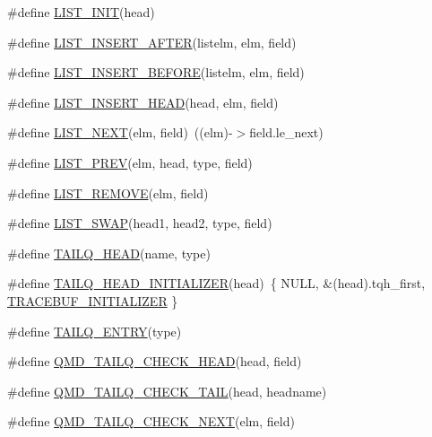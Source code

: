 \begin{DoxyCompactItemize}
\item 
\#define \hyperlink{queue_8h_a304b5b7f7bdcba2793eaba9c890991c3}{L\-I\-S\-T\-\_\-\-I\-N\-I\-T}(head)
\item 
\#define \hyperlink{queue_8h_aab62f53d4c94ab67bf7c4dc5c7670f64}{L\-I\-S\-T\-\_\-\-I\-N\-S\-E\-R\-T\-\_\-\-A\-F\-T\-E\-R}(listelm, elm, field)
\item 
\#define \hyperlink{queue_8h_a73d12127b84f84215eb03a4fb20feebb}{L\-I\-S\-T\-\_\-\-I\-N\-S\-E\-R\-T\-\_\-\-B\-E\-F\-O\-R\-E}(listelm, elm, field)
\item 
\#define \hyperlink{queue_8h_ad80d8d658fdb46a9f7cc81cb2ae54885}{L\-I\-S\-T\-\_\-\-I\-N\-S\-E\-R\-T\-\_\-\-H\-E\-A\-D}(head, elm, field)
\item 
\#define \hyperlink{queue_8h_ad150fcc4dc3e0a56600101f1f1065ed5}{L\-I\-S\-T\-\_\-\-N\-E\-X\-T}(elm, field)~((elm)-\/$>$field.\-le\-\_\-next)
\item 
\#define \hyperlink{queue_8h_a7458f2852ae931b2ed5426311b53d029}{L\-I\-S\-T\-\_\-\-P\-R\-E\-V}(elm, head, type, field)
\item 
\#define \hyperlink{queue_8h_a4f60a3fedbebc5ef6edded99062dd98d}{L\-I\-S\-T\-\_\-\-R\-E\-M\-O\-V\-E}(elm, field)
\item 
\#define \hyperlink{queue_8h_a71800bd6ea3903a1068f87e4f07cc851}{L\-I\-S\-T\-\_\-\-S\-W\-A\-P}(head1, head2, type, field)
\item 
\#define \hyperlink{queue_8h_a4abce769a262e090c1f601605b9d6c76}{T\-A\-I\-L\-Q\-\_\-\-H\-E\-A\-D}(name, type)
\item 
\#define \hyperlink{queue_8h_ac269df7d4126ed9885156cbad2cbf8af}{T\-A\-I\-L\-Q\-\_\-\-H\-E\-A\-D\-\_\-\-I\-N\-I\-T\-I\-A\-L\-I\-Z\-E\-R}(head)~\{ N\-U\-L\-L, \&(head).tqh\-\_\-first, \hyperlink{queue_8h_a0397af84b4a238c2b678721a88b6eccc}{T\-R\-A\-C\-E\-B\-U\-F\-\_\-\-I\-N\-I\-T\-I\-A\-L\-I\-Z\-E\-R} \}
\item 
\#define \hyperlink{queue_8h_af71bfd90dc9d00fb03545fe66c67d673}{T\-A\-I\-L\-Q\-\_\-\-E\-N\-T\-R\-Y}(type)
\item 
\#define \hyperlink{queue_8h_a2fadd77a30e452cb44e961a3349e965c}{Q\-M\-D\-\_\-\-T\-A\-I\-L\-Q\-\_\-\-C\-H\-E\-C\-K\-\_\-\-H\-E\-A\-D}(head, field)
\item 
\#define \hyperlink{queue_8h_a388344b503d238583a1e7d710aa403ef}{Q\-M\-D\-\_\-\-T\-A\-I\-L\-Q\-\_\-\-C\-H\-E\-C\-K\-\_\-\-T\-A\-I\-L}(head, headname)
\item 
\#define \hyperlink{queue_8h_ac8ae401a8fb8a0c6259003d81717c137}{Q\-M\-D\-\_\-\-T\-A\-I\-L\-Q\-\_\-\-C\-H\-E\-C\-K\-\_\-\-N\-E\-X\-T}(elm, field)

\end{DoxyCompactItemize}
